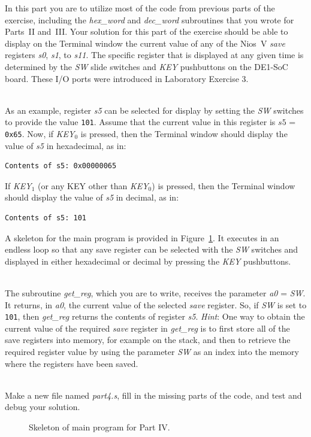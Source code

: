 \documentclass[epsfig,10pt,fullpage]{article}
\newcommand{\CommonDocsPath}{../../../../common/docs}
\begin{document}
In this part you are to utilize most of the code from previous parts of the exercise, 
including the {\it hex\_word} and {\it dec\_word} subroutines that you wrote for Parts~II
and~III.  Your solution for this part of the exercise should be able to display on the
Terminal window the current value of any of the Nios~V {\it save} registers {\it s0}, {\it s1}, to
{\it s11}. The specific register that is displayed at any given time is determined by the
{\it SW} slide switches and {\it KEY} pushbuttons on the DE1-SoC board. These I/O ports
were introduced in Laboratory Exercise 3. 

~\\
As an example, register {\it s5} can be selected for display 
by setting the {\it SW} switches to provide the value \texttt{101}. Assume
that the current value in this register is $s5$ = \texttt{0x65}. Now, if {\it KEY}$_0$ is 
pressed, then the Terminal window should display the value of {\it s5} in hexadecimal, as in:

\begin{verbatim}
Contents of s5: 0x00000065
\end{verbatim}

If {\it KEY}$_1$ (or any KEY other than {\it KEY}$_0$) is pressed, then the Terminal window 
should display the value of {\it s5} in decimal, as in:

\begin{verbatim}
Contents of s5: 101
\end{verbatim}

A skeleton for the main program is provided in Figure~\ref{fig:skel}. It executes in an 
endless loop so that any save register can be selected with the {\it SW} switches 
and displayed in either hexadecimal or decimal by pressing the {\it KEY} pushbuttons.

~\\
The subroutine
{\it get\_reg}, which you are to write, receives the parameter {\it a0} = {\it SW}. It returns,
in {\it a0}, the current value of the selected {\it save} register. So, if {\it SW} is set 
to \texttt{101}, then {\it get\_reg} returns the contents of register {\it s5}.
{\it Hint}: One way to obtain the current value of the required {\it save} register in 
{\it get\_reg} is to first store all of the save registers into memory, for example on the 
stack, and then to retrieve the required register value by using the parameter {\it SW} as 
an index into the memory where the registers have been saved.

~\\
Make a new file named {\it part4.s}, fill in the missing parts of the code, and test and debug your
solution. 

\begin{figure}[t]
\begin{center}

\end{center}
\caption{Skeleton of main program for Part IV.}
\label{fig:skel}
\end{figure}


\end{document}

